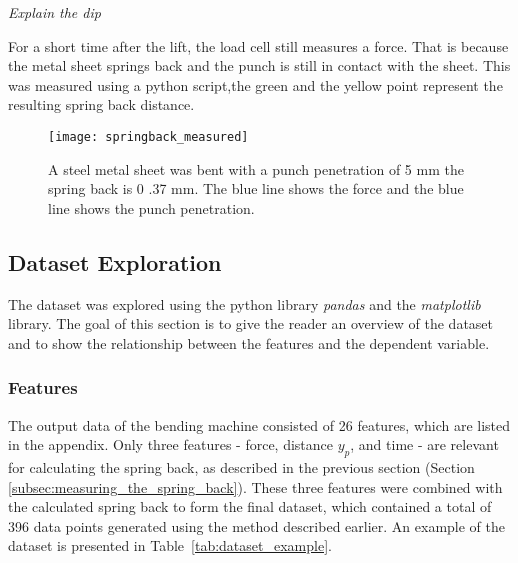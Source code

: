 \textit{Explain the dip}

For a short time after the lift, the load cell still measures a force.
That is because the metal sheet springs back and the punch is still in contact with the
sheet.
This was measured using a python script,the green and the yellow point represent the
resulting spring back distance.

\begin{figure}[H]
    \begin{tcolorbox}[arc=0pt,boxrule=0.5pt]
        \centering
        \texttt{[image: springback\_measured]}
    \end{tcolorbox}
    \caption{A steel metal sheet was bent with a punch penetration of 5
    mm the spring back is 0
    .37 mm. The blue line
    shows the force and the blue line shows the punch penetration.}
    \label{fig:springback_measured}
\end{figure}


\subsection{Dataset Exploration}\label{subsec:dataset-exploration}
The dataset was explored using the python library \textit{pandas}
\cite{mckinney-proc-scipy-2010} and the \textit{matplotlib}~\cite{Hunter:2007} library.
The goal of this section is to give the reader an overview of the dataset and
to show the relationship between the features and the dependent variable.

\subsubsection{Features}
The output data of the bending machine consisted of 26 features, which are listed in
the appendix.
Only three features - force, distance $y_p$, and time - are relevant for
calculating the spring back, as described in the previous section (Section
\ref{subsec:measuring_the_spring_back}).
These three features were combined with the calculated spring back to form the final
dataset, which contained a total of
396 data points generated using the method described earlier.
An example of the dataset is presented in Table~\ref{tab:dataset_example}.

